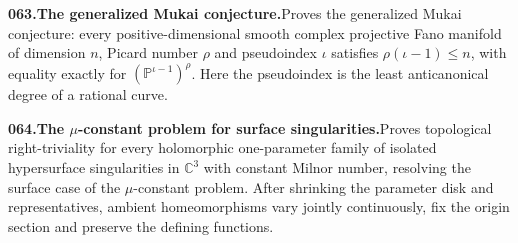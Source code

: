 \documentclass[11pt,a4paper]{article}
\begin{document}
  \par \begin{minipage}{\linewidth}
  \fontsize{10.5}{12.6}\selectfont\RaggedRight
  \hypertarget{result 063}{}
  {\bfseries\textcolor{muted}{063.}\enspace The generalized Mukai conjecture.}\enspace Proves the generalized Mukai conjecture: every positive-dimensional smooth complex projective Fano manifold of dimension $n$, Picard number $\rho$ and pseudoindex $\iota$ satisfies $\rho(\iota-1)\le n$, with equality exactly for $(\mathbb P^{\iota-1})^\rho$. Here the pseudoindex is the least anticanonical degree of a rational curve.\par
  \end{minipage}\par\vspace{5pt}



  \par \begin{minipage}{\linewidth}
  \fontsize{10.5}{12.6}\selectfont\RaggedRight
  \hypertarget{result 064}{}
  {\bfseries\textcolor{muted}{064.}\enspace The $\mu$-constant problem for surface singularities.}\enspace Proves topological right-triviality for every holomorphic one-parameter family of isolated hypersurface singularities in $\mathbb C^3$ with constant Milnor number, resolving the surface case of the $\mu$-constant problem. After shrinking the parameter disk and representatives, ambient homeomorphisms vary jointly continuously, fix the origin section and preserve the defining functions.\par
  \end{minipage}\par\vspace{5pt}
\end{document}
